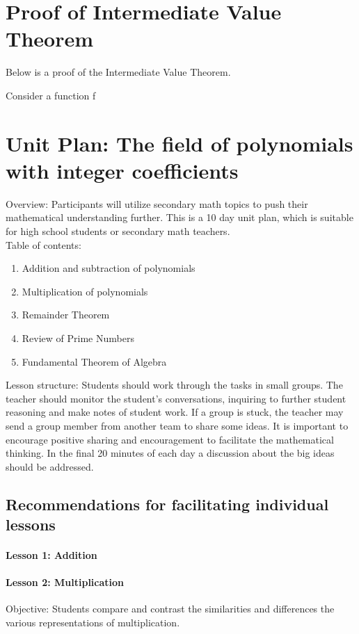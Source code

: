 \documentclass[12pt]{article}
\begin{document}
\begin{appendices}
\section*{Proof of Intermediate Value Theorem}
Below is a proof of the Intermediate Value Theorem.

Consider a function f



\section*{Unit Plan: The field of polynomials with integer coefficients}

Overview: Participants will utilize secondary math topics to push their mathematical understanding further.  This is a 10 day unit plan, which is suitable for high school students or secondary math teachers.\\

Table of contents:
\begin{enumerate}
\item Addition and subtraction of polynomials
\item Multiplication of polynomials
\item Remainder Theorem
\item Review of Prime Numbers
\item Fundamental Theorem of Algebra
\end{enumerate}

Lesson structure: Students should work through the tasks in small groups.  The teacher should monitor the student's conversations, inquiring to further student reasoning and make notes of student work.  If a group is stuck, the teacher may send a group member from another team to share some ideas.  It is important to encourage positive sharing and encouragement to facilitate the mathematical thinking.  In the final 20 minutes of each day a discussion about the big ideas should be addressed.

\pagebreak

\subsection*{Recommendations for facilitating individual lessons}
\paragraph*{Lesson 1: Addition}

\paragraph*{Lesson 2: Multiplication}
Objective: Students compare and contrast the similarities and differences the various representations of multiplication.\\


\end{appendices}
\end{document}

